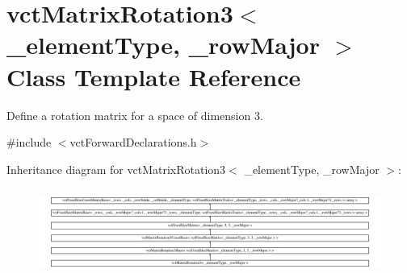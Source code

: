 \hypertarget{classvct_matrix_rotation3}{\section{vct\-Matrix\-Rotation3$<$ \-\_\-element\-Type, \-\_\-row\-Major $>$ Class Template Reference}
\label{classvct_matrix_rotation3}
}


Define a rotation matrix for a space of dimension 3.  




{\ttfamily \#include $<$vct\-Forward\-Declarations.\-h$>$}

Inheritance diagram for vct\-Matrix\-Rotation3$<$ \-\_\-element\-Type, \-\_\-row\-Major $>$\-:\begin{figure}[H]
\begin{center}
\leavevmode
\includegraphics[height=2.840237cm]{d2/d92/classvct_matrix_rotation3}
\end{center}
\end{figure}
